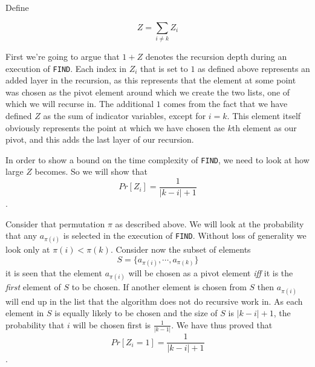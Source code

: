 \documentclass[article,a4paper,oneside]{memoir}
\newcommand{\+}[1]{\ensuremath{\boldsymbol{#1}}}
\begin{document}
Define 

$$Z=\sum_{i\neq k} Z_i$$

First we're going to argue that $1+Z$ denotes the recursion depth during an execution of \texttt{FIND}. Each index in $Z_i$ that is set to $1$ as defined above represents an added layer in the recursion, as this represents that the element at some point was chosen as the pivot element around which we create the two lists, one of which we will recurse in. The additional $1$ comes from the fact that we have defined $Z$ as the sum of indicator variables, except for $i=k$. This element itself obviously represents the point at which we have chosen the $k$th element as our pivot, and this adds the last layer of our recursion.
\par
In order to show a bound on the time complexity of \texttt{FIND}, we need to look at how large $Z$ becomes. So we will show that $$Pr[Z_{i}]=\frac{1}{|k-i|+1}$$.
\par
Consider that permutation $\pi$ as described above. We will look at the probability that any $a_{\pi(i)}$ is selected in the execution of \texttt{FIND}. Without loss of generality we look only at $\pi(i) < \pi(k)$. Consider now the subset of elements $$S = \lbrace a_{\pi(i)},\cdots,a_{\pi(k)}\rbrace$$ it is seen that the element $a_{\pi(i)}$ will be chosen as a pivot element \emph{iff} it is the \emph{first} element of $S$ to be chosen. If another element is chosen from $S$ then $a_{\pi(i)}$ will end up in the list that the algorithm does not do recursive work in. As each element in $S$ is equally likely to be chosen and the size of $S$ is $|k - i| + 1$, the probability that $i$ will be chosen first is $\frac{1}{|k -1|}$. We have thus proved that $$Pr[Z_{i} = 1] = \frac{1}{|k-i|+1}$$.
\end{document}
